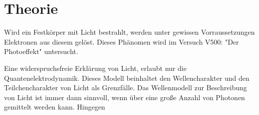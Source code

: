 \section{Theorie}

Wird ein Festkörper mit Licht bestrahlt, werden unter gewissen Vorraussetzungen
Elektronen aus diesem gelöst. Dieses Phänomen wird im Versuch V500: "Der Photoeffekt"
untersucht.

Eine widerspruchsfreie Erklärung von Licht, erlaubt nur die Quantenelektrodynamik.
Dieses Modell beinhaltet den Wellencharakter und den Teilchencharakter von Licht
als Grenzfälle. Das Wellenmodell zur Beschreibung von Licht ist immer dann sinnvoll,
wenn über eine große Anzahl von Photonen gemittelt werden kann. Hingegen 
